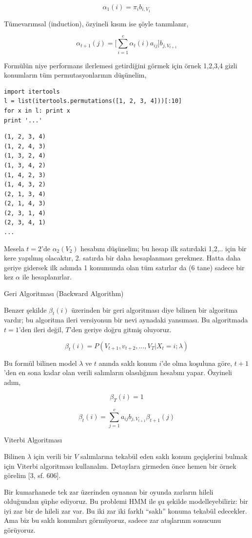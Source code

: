 \documentclass[12pt,fleqn]{article}\usepackage{../../common}
\begin{document}
$$
\alpha_1(i) = \pi_i b_{i,V_1}
$$

Tümevarımsal (induction), özyineli kısım ise şöyle tanımlanır,

$$
\alpha_{t+1}(j) = \bigg[  \sum_{i=1}^{c} \alpha_t(i)a_{ij} \bigg] b_{j,V_{t+1}}
$$

Formülün niye performans ilerlemesi getirdiğini görmek için örnek 1,2,3,4
gizli konumların tüm permutasyonlarının düşünelim,

\begin{verbatim}
import itertools
l = list(itertools.permutations([1, 2, 3, 4]))[:10]
for x in l: print x
print '...'
\end{verbatim}

\begin{verbatim}
(1, 2, 3, 4)
(1, 2, 4, 3)
(1, 3, 2, 4)
(1, 3, 4, 2)
(1, 4, 2, 3)
(1, 4, 3, 2)
(2, 1, 3, 4)
(2, 1, 4, 3)
(2, 3, 1, 4)
(2, 3, 4, 1)
...
\end{verbatim}

Mesela $t=2$'de $\alpha_2(V_2)$ hesabını düşünelim; bu hesap ilk satırdaki
1,2,.. için bir kere yapılmış olacaktır, 2. satırda bir daha hesaplanması
gerekmez. Hatta daha geriye gidersek ilk adımda 1 konumunda olan tüm
satırlar da (6 tane) sadece bir kez $\alpha$ ile hesaplanırlar.

Geri Algoritması (Backward Algorithm) 

Benzer şekilde $\beta_t(i)$ üzerinden bir geri algoritması diye bilinen bir
algoritma vardır; bu algoritma ileri versiyonun bir nevi aynadaki
yansıması. Bu algoritmada $t=1$'den ileri değil, $T$'den geriye doğru
gitmiş oluyoruz.

$$ \beta_t(i) = P(V_{t+1}, v_{t+2},...,V_{T} | X_t = i ; \lambda )  $$

Bu formül bilinen model $\lambda$ ve $t$ anında saklı konum $i$'de olma
koşuluna göre, $t+1$'den en sona kadar olan verili salımların olasılığının
hesabını yapar. Özyineli adım, 

$$ \beta_T(i) = 1 $$

$$ \beta_t(i) = \sum_{j=1}^{c} a_{ij}b_{j,V_{t+1}} \beta_{t+1}(j)  $$

Viterbi Algoritması

Bilinen $\lambda$ için verili bir $V$ salımlarına tekabül eden saklı konum
geçişlerini bulmak için Viterbi algoritması kullanalım. Detaylara girmeden
önce hemen bir örnek görelim [3, sf. 606].

Bir kumarhanede tek zar üzerinden oynanan bir oyunda zarların hileli
olduğundan şüphe ediyoruz. Bu problemi HMM ile şu şekilde modelleyebiliriz:
bir iyi zar bir de hileli zar var. Bu iki zar iki farklı ``saklı'' konuma
tekabül edecekler. Ama biz bu saklı konumları görmüyoruz, sadece zar
atışlarının sonucunu görüyoruz. 
\end{document}

